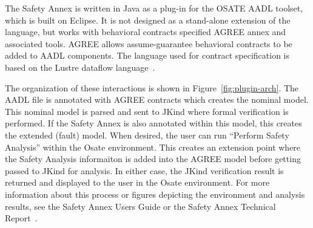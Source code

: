 The Safety Annex is written in Java as a plug-in for the OSATE AADL toolset, which is built on Eclipse.  It is not designed as a stand-alone extension of the language, but works with behavioral contracts specified AGREE annex and associated tools.  AGREE allows assume-guarantee behavioral contracts to be added to AADL components.  The language used for contract specification is based on the Lustre dataflow language~\cite{Halbwachs91:IEEE}. 

The organization of these interactions  is shown in Figure~\ref{fig:plugin-arch}. The AADL file is annotated with AGREE contracts which creates the nominal model. This nominal model is parsed and sent to JKind where formal verification is performed. If the Safety Annex is also annotated within this model, this creates the extended (fault) model. When desired, the user can run ``Perform Safety Analysis'' within the Osate environment. This creates an extension point where the Safety Analysis informaiton is added into the AGREE model before getting passed to JKind for analysis. In either case, the JKind verification result is returned and displayed to the user in the Osate environment. For more information about this process or figures depicting the environment and analysis results, see the Safety Annex Users Guide or the Safety Annex Technical Report~\cite{amaseRepo, SATechReport}.






